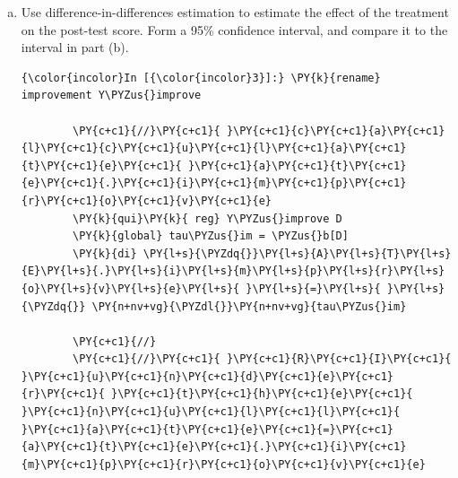 \documentclass[11pt,notitlepage]{article}\usepackage[]{graphicx}\usepackage[]{color}
\makeatletter
\newenvironment{kframe}{%
 \def\at@end@of@kframe{}%
 \ifinner\ifhmode%
  \def\at@end@of@kframe{\end{minipage}}%
  \begin{minipage}{\columnwidth}%
 \fi\fi%
 \def\FrameCommand##1{\hskip\@totalleftmargin \hskip-\fboxsep
 \colorbox{shadecolor}{##1}\hskip-\fboxsep
     \hskip-\linewidth \hskip-\@totalleftmargin \hskip\columnwidth}%
 \MakeFramed {\advance\hsize-\width
   \@totalleftmargin\z@ \linewidth\hsize
   \@setminipage}}%
 {\par\unskip\endMakeFramed%
 \at@end@of@kframe}
\newenvironment{knitrout}{}{} %
\makeatother
\begin{document}
\begin{enumerate}[a)]
\begin{knitrout}
\begin{kframe}
\begin{Verbatim}[commandchars=\\\{\}]
 p=0.50428 [one-tailed test of Ho:  theta(D==0)<=theta(D==1)]
 p=0.50000 [one-tailed test of Ho:  theta(D==0)>=theta(D==1)]
 p=0.76450 [two-tailed test of Ho:  theta(D==0)==theta(D==1)]

Saving log file to ate\_ci.dta{\ldots}done.



(1 observation deleted)


(-2.259, 1.593)


    \end{Verbatim}

\end{kframe}
\end{knitrout}

We obtained a difference-in-means estimate of the ATE of \ensuremath{-0.3333333} and a 95\% confidence interval of [\ensuremath{-2.259}, 1.593]. This confidence interval is wide enough to include much larger and much smaller treatment effects -- even crossing zero.

\item Use difference-in-differences estimation to estimate the effect of the treatment on the post-test score. Form a 95\% confidence interval, and compare it to the interval in part (b).

\begin{knitrout}
\color{fgcolor}\begin{kframe}
   \begin{Verbatim}[commandchars=\\\{\}]
{\color{incolor}In [{\color{incolor}3}]:} \PY{k}{rename} improvement Y\PYZus{}improve 
        
        \PY{c+c1}{//}\PY{c+c1}{ }\PY{c+c1}{c}\PY{c+c1}{a}\PY{c+c1}{l}\PY{c+c1}{c}\PY{c+c1}{u}\PY{c+c1}{l}\PY{c+c1}{a}\PY{c+c1}{t}\PY{c+c1}{e}\PY{c+c1}{ }\PY{c+c1}{a}\PY{c+c1}{t}\PY{c+c1}{e}\PY{c+c1}{.}\PY{c+c1}{i}\PY{c+c1}{m}\PY{c+c1}{p}\PY{c+c1}{r}\PY{c+c1}{o}\PY{c+c1}{v}\PY{c+c1}{e}
        \PY{k}{qui}\PY{k}{ reg} Y\PYZus{}improve D
        \PY{k}{global} tau\PYZus{}im = \PYZus{}b[D]
        \PY{k}{di} \PY{l+s}{\PYZdq{}}\PY{l+s}{A}\PY{l+s}{T}\PY{l+s}{E}\PY{l+s}{.}\PY{l+s}{i}\PY{l+s}{m}\PY{l+s}{p}\PY{l+s}{r}\PY{l+s}{o}\PY{l+s}{v}\PY{l+s}{e}\PY{l+s}{ }\PY{l+s}{=}\PY{l+s}{ }\PY{l+s}{\PYZdq{}} \PY{n+nv+vg}{\PYZdl{}}\PY{n+nv+vg}{tau\PYZus{}im}
        
        \PY{c+c1}{//}
        \PY{c+c1}{//}\PY{c+c1}{ }\PY{c+c1}{R}\PY{c+c1}{I}\PY{c+c1}{ }\PY{c+c1}{u}\PY{c+c1}{n}\PY{c+c1}{d}\PY{c+c1}{e}\PY{c+c1}{r}\PY{c+c1}{ }\PY{c+c1}{t}\PY{c+c1}{h}\PY{c+c1}{e}\PY{c+c1}{ }\PY{c+c1}{n}\PY{c+c1}{u}\PY{c+c1}{l}\PY{c+c1}{l}\PY{c+c1}{ }\PY{c+c1}{a}\PY{c+c1}{t}\PY{c+c1}{e}\PY{c+c1}{=}\PY{c+c1}{a}\PY{c+c1}{t}\PY{c+c1}{e}\PY{c+c1}{.}\PY{c+c1}{i}\PY{c+c1}{m}\PY{c+c1}{p}\PY{c+c1}{r}\PY{c+c1}{o}\PY{c+c1}{v}\PY{c+c1}{e}
        

\end{Verbatim}
\end{kframe}
\end{knitrout}
\end{enumerate}
\end{document}
